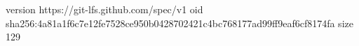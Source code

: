 version https://git-lfs.github.com/spec/v1
oid sha256:4a81a1f6c7e12fe7528ce950b0428702421c4bc768177ad99ff9eaf6cf8174fa
size 129
